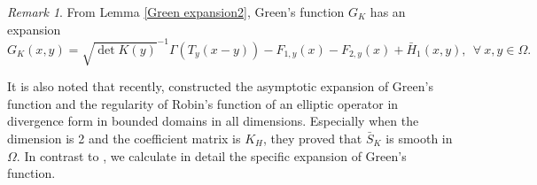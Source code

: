 \documentclass[12pt,reqno]{amsart}
\numberwithin{equation}{section}
\theoremstyle{definition}
\theoremstyle{remark}
\newtheorem{remark}[theorem]{Remark}
\begin{document}
\begin{remark}
From Lemma \ref{Green expansion2}, Green's function $ G_K $ has an expansion
\begin{equation*} 
G_K(x,y)=\sqrt{\det K(y)}^{-1}\Gamma\left (T_y(x-y)\right )-F_{1,y}(x)-F_{2,y}(x)+\bar{H}_1(x,y),\ \ \forall\ x,y\in\Omega.
\end{equation*}

It is also noted that recently, \cite{CW3} constructed the asymptotic expansion of Green's function and the regularity of Robin's function of an elliptic operator in divergence form in bounded domains in all dimensions. Especially when the dimension is 2 and the coefficient matrix is $ K_H $, they proved that $ \bar{S}_K $ is smooth in $ \Omega. $ In contrast to \cite{CW3}, we  calculate  in detail the specific expansion of  Green's function.
\end{remark}
\end{document}
